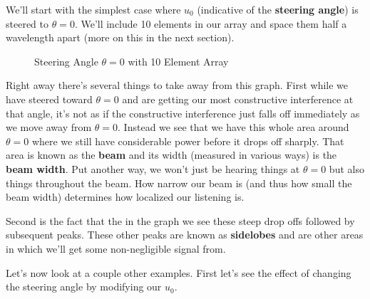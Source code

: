 \documentclass[10pt,a4paper]{article}
\begin{document}
We'll start with the simplest case where $u_0$ (indicative of the \textbf{steering angle}) is steered to $\theta=0$. We'll include 10 elements in our array and space them half a wavelength apart (more on this in the next section). 

\begin{figure}[!htb]
\caption{\label{fig:my-label} Steering Angle $\theta=0$ with 10 Element Array}
\end{figure}

Right away there's several things to take away from this graph. First while we have steered toward $\theta=0$ and are getting our most constructive interference at that angle, it's not as if the constructive interference just falls off immediately as we move away from $\theta=0$. Instead we see that we have this whole area around $\theta=0$ where we still have considerable power before it drops off sharply. That area is known as the \textbf{beam} and its width (measured in various ways) is the \textbf{beam width}. Put another way, we won't just be hearing things at $\theta=0$ but also things throughout the beam. How narrow our beam is (and thus how small the beam width) determines how localized our listening is. 

Second is the fact that the in the graph we see these steep drop offs followed by subsequent peaks. These other peaks are known as \textbf{sidelobes} and are other areas in which we'll get some non-negligible signal from. 

Let's now look at a couple other examples. First let's see the effect of changing the steering angle by modifying our $u_0$. 
\end{document}
